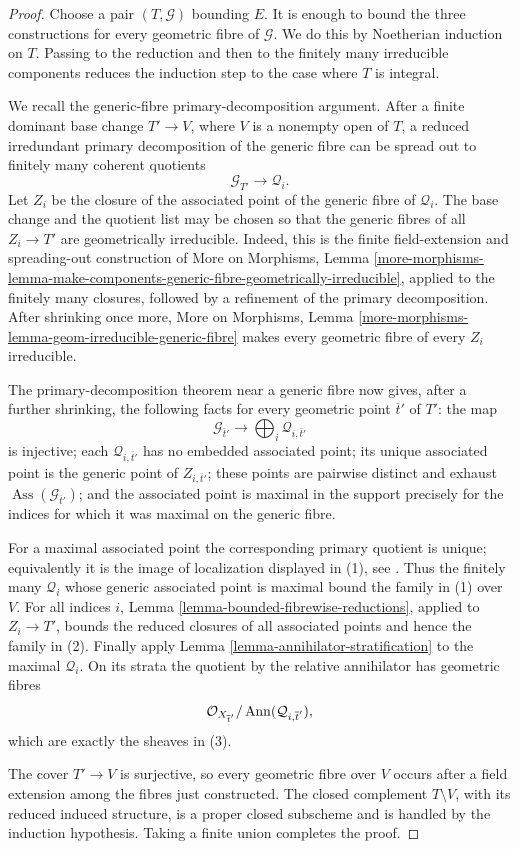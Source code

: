 \begin{proof}
Choose a pair $(T,\mathcal{G})$ bounding $E$. It is enough to bound the
three constructions for every geometric fibre of $\mathcal{G}$. We do
this by Noetherian induction on $T$. Passing to the reduction and then to
the finitely many irreducible components reduces the induction step to the
case where $T$ is integral.

We recall the generic-fibre primary-decomposition argument. After a finite
dominant base change $T' \to V$, where $V$ is a nonempty open of $T$, a
reduced irredundant primary decomposition of the generic fibre can be
spread out to finitely many coherent quotients
$$
\mathcal{G}_{T'} \longrightarrow \mathcal{Q}_i.
$$
Let $Z_i$ be the closure of the associated point of the generic fibre of
$\mathcal{Q}_i$. The base change and the quotient list may be chosen so
that the generic fibres of all $Z_i \to T'$ are geometrically irreducible.
Indeed, this is the finite field-extension and spreading-out construction
of More on Morphisms, Lemma
\ref{more-morphisms-lemma-make-components-generic-fibre-geometrically-irreducible},
applied to the finitely many closures, followed by a refinement of the
primary decomposition. After shrinking once more, More on Morphisms,
Lemma \ref{more-morphisms-lemma-geom-irreducible-generic-fibre} makes every
geometric fibre of every $Z_i$ irreducible.

The primary-decomposition theorem near a generic fibre
\cite[IV, 9.8.2--9.8.4]{EGA} now gives, after a further shrinking, the
following facts for every geometric point $\overline{t}'$ of $T'$:
the map
$$
\mathcal{G}_{\overline{t}'} \longrightarrow
\bigoplus_i \mathcal{Q}_{i,\overline{t}'}
$$
is injective; each $\mathcal{Q}_{i,\overline{t}'}$ has no embedded
associated point; its unique associated point is the generic point of
$Z_{i,\overline{t}'}$; these points are pairwise distinct and exhaust
$\operatorname{Ass}(\mathcal{G}_{\overline{t}'})$; and the associated
point is maximal in the support precisely for the indices for which it was
maximal on the generic fibre.

For a maximal associated point the corresponding primary quotient is
unique; equivalently it is the image of localization displayed in (1),
see \cite[IV, 3.2.6]{EGA}. Thus the finitely many $\mathcal{Q}_i$
whose generic associated point is maximal bound the family in (1) over
$V$. For all indices $i$, Lemma
\ref{lemma-bounded-fibrewise-reductions}, applied to $Z_i \to T'$, bounds
the reduced closures of all associated points and hence the family in (2).
Finally apply Lemma \ref{lemma-annihilator-stratification} to the maximal
$\mathcal{Q}_i$. On its strata the quotient by the relative annihilator
has geometric fibres
$$
\mathcal{O}_{X_{\overline{t}'}}/
\mathop{\rm Ann}(\mathcal{Q}_{i,\overline{t}'}),
$$
which are exactly the sheaves in (3).

The cover $T' \to V$ is surjective, so every geometric fibre over $V$
occurs after a field extension among the fibres just constructed. The
closed complement $T \setminus V$, with its reduced induced structure, is
a proper closed subscheme and is handled by the induction hypothesis.
Taking a finite union completes the proof.
\end{proof}
